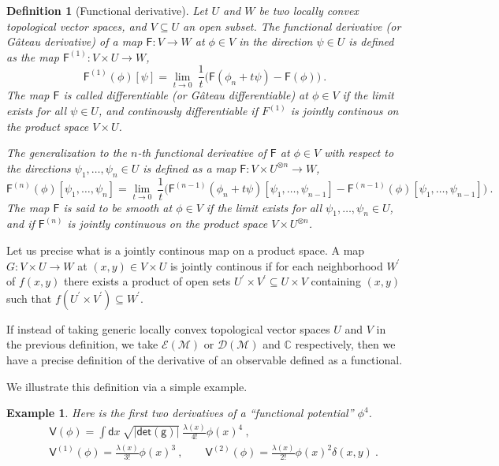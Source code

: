 \documentclass[10pt]{book}
\newcommand{\abs}[1]{\left|#1\right|}
\renewcommand{\det}{\mathsf{det}}
\newcommand{\Dcal}{\mathcal{D}}
\newcommand{\Ecal}{\mathcal{E}}
\newcommand{\Mcal}{\mathcal{M}}
\newcommand{\Cbb}{\mathbb{C}}
\newcommand{\Fsf}{\mathsf{F}}
\newcommand{\Vsf}{\mathsf{V}}
\newcommand{\dsf}{\mathsf{d}}
\newcommand{\gsf}{\mathsf{g}}
\theoremstyle{break}
\newtheorem{example}{Example}
\newtheorem{definition}{Definition}
\begin{document}
\begin{definition}[Functional derivative]
Let $U$ and $W$ be two locally convex topological vector spaces, and $V \subseteq U$ an open subset. The functional derivative (or Gâteau derivative) of a map $\Fsf:  V \to W$ at $\phi \in V$ in the direction $\psi \in U$ is defined as the map $\Fsf^{(1)} : V \times U \to W$,
%
\begin{equation*}
\Fsf^{(1)}(\phi)[\psi] = \lim_{t \to 0} \ \frac{1}{t} \bigg( \Fsf(\phi_n + t \psi) - \Fsf(\phi) \bigg) \ .
\end{equation*}
% 
The map $\Fsf$ is called differentiable (or Gâteau differentiable) at $\phi \in V$ if the limit exists for all $\psi \in U$, and continously differentiable if $F^{(1)}$ is jointly continous on the product space $V \times U$.\par%
%
%
The generalization to the $n$-th functional derivative of $\Fsf$ at $\phi \in V$ with respect to the directions $\psi_1, \dots, \psi_n \in U$ is defined as a map $\Fsf : V \times U^{\otimes n} \to W$,
%
\begin{equation*}%
\Fsf^{(n)}(\phi)[\psi_1,\dots ,\psi_n] = \lim_{t \to 0} \ \frac{1}{t} \bigg( \Fsf^{(n-1)}(\phi_n + t \psi)[\psi_1,\dots ,\psi_{n-1}] - \Fsf^{(n-1)}(\phi)[\psi_1,\dots ,\psi_{n-1}] \bigg) \ .
\end{equation*}
%
The map $\Fsf$ is said to be smooth at $\phi \in V$ if the limit exists for all $\psi_1, \dots, \psi_n \in U$, and if $\Fsf^{(n)}$ is jointly continuous on the product space $V \times U^{\otimes n}$.
\end{definition}


Let us precise what is a jointly continous map on a product space. A map $G : V \times U \to W$ at $(x,y) \in V \times U$ is jointly continous if for each neighborhood $W^\prime$ of $f(x,y)$ there exists a product of open sets $U^\prime \times V^\prime \subseteq U \times V$ containing $(x,y)$ such that $f(U^\prime \times V^\prime) \subseteq W^\prime$.


\bigskip


If instead of taking generic locally convex topological vector spaces $U$ and $V$ in the previous definition, we take $\Ecal(\Mcal)$ or $\Dcal(\Mcal)$ and $\Cbb$ respectively, then we have a precise definition of the derivative of an observable defined as a functional.


\bigskip


We illustrate this definition via a simple example.%
%
\begin{example}
%
Here is the first two derivatives of a ``functional potential'' $\phi^4$. 
%
\begin{eqnarray*}
&& \Vsf(\phi) = \int \dsf x \ \sqrt{\abs{\det(\gsf)}} \ \frac{\lambda(x)}{4!} \phi(x)^4 \ ,\\
%
&& \Vsf^{(1)}(\phi) = \frac{\lambda(x)}{3!} \phi(x)^3 \ , \qquad
%
\Vsf^{(2)}(\phi) = \frac{\lambda(x)}{2!} \phi(x)^2 \delta(x,y) \ .
\end{eqnarray*}
%
\end{example}
\end{document}
